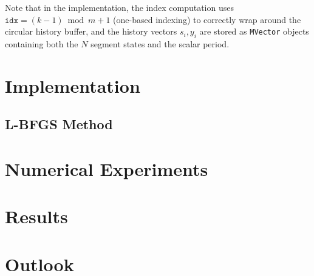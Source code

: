 \documentclass[11pt,a4paper]{article}
\begin{document}
Note that in the implementation, the index computation uses $\texttt{idx} = (k-1) \bmod m + 1$ (one-based indexing) to correctly wrap around the circular history buffer, and the history vectors $s_i, y_i$ are stored as \texttt{MVector} objects containing both the $N$ segment states and the scalar period.


\section{Implementation}

\subsection{L-BFGS Method}


\section{Numerical Experiments}

\section{Results}

\section{Outlook}
\end{document}
